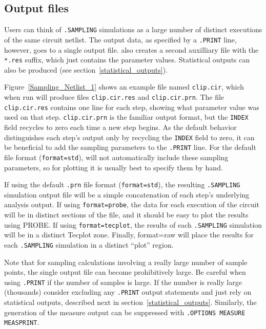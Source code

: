 \subsection{Output files}
\label{sampling_output_files}

Users can think of \texttt{.SAMPLING} simulations as a large number of distinct executions
of the same circuit netlist.  The output data, as specified by a \texttt{.PRINT}
line, however, goes to a single output file.  
\Xyce{} also creates a second auxilliary file with the \texttt{*.res} 
suffix, which just contains the parameter values.  Statistical outputs 
can also be produced (see section~\ref{statistical_outputs}).

Figure~\ref{Sampling_Netlist_1} shows an example file named \verb+clip.cir+, which when run will produce files
\verb+clip.cir.res+ and \verb+clip.cir.prn+.  The file \verb+clip.cir.res+
contains one line for each step, showing what parameter value was used
on that step.  \verb+clip.cir.prn+ is the familiar output format, but
the \verb+INDEX+ field recycles to zero each time a new step begins.
As the default behavior distinguishes each step's output only by recycling 
the \verb+INDEX+ field to zero, it can be beneficial to add the sampling
parameters to the \verb+.PRINT+ line.   For the default file format 
(\texttt{format=std}), \Xyce{} will not automatically include these sampling parameters,
so for plotting it is usually best to specify them by hand.

If using the default \texttt{.prn} file format (\texttt{format=std}), the 
resulting \texttt{.SAMPLING} simulation output file will be a simple concatenation of
each step's underlying analysis output.
If using \texttt{format=probe}, the data for each execution of the circuit
will be in distinct sections of the file, and it should be easy to 
plot the results using PROBE.  If using \texttt{format=tecplot}, 
the results of each \texttt{.SAMPLING} simulation will be in a distinct
Tecplot zone. Finally, format=raw will place the results for each \texttt{.SAMPLING} 
simulation in a distinct ``plot'' region. 

Note that for sampling calculations involving a really large number of sample 
points, the single output file can become prohibitively large.  Be careful when 
using \verb|.PRINT| if the number of samples is large.   If the number is really 
large (thousands) consider excluding any \verb|.PRINT| output statements and 
just rely on statistical outputs, described next in section~\ref{statistical_outputs}.
Similarly, the generation of the measure output can be suppressed with 
\texttt{.OPTIONS MEASURE MEASPRINT}.

